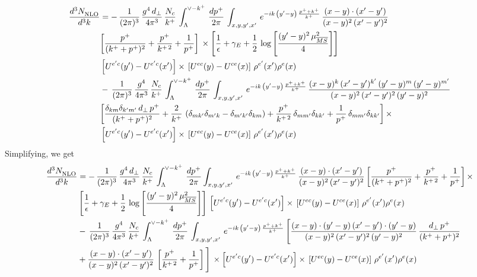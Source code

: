 \documentclass[10pt]{article}
\begin{document}
\begin{align}
     \frac{d^{3}N_{\rm NLO}^{\rm}}{d^{3}k}  & = -\,\frac{1}{(2\pi)^{3}}\,\frac{g^{4}\,d_{\perp}}{4\pi^{3}}\,\frac{N_{c}}{k^{+}}\,\int_{\Lambda}^{\vee-k^{+}}\, \frac{dp^{+}}{2\pi}\,\int_{x,y,y^{\prime},x'}\,e^{-ik\,\left(y'-y\right)\,\frac{p^{+}+k^{+}}{k^{+}}}\,\frac{(x-y)\cdot (x'-y')}{(x-y)^{2}\,(x'-y')^{2}}\notag \\ &  \bigg[\frac{p^{+}}{(k^{+}+p^{+})^{2}} + \frac{p^{+}}{k^{+\,2}}+\frac{1}{p^{+}}\bigg]\,\times\left[\frac{1}{\epsilon} +\gamma_{E} +\frac{1}{2}\,\log{\left[\frac{(y'-y)^{2}\,\mu^{2}_{\overline{MS}}}{4}\right]}\right]\notag \\ &  \left[U^{e'c}(y') - U^{e'c}(x')\right] \times\, \left[U^{ec}(y) - U^{ce}(x)\right]\, \rho^{e'}(x') \rho^{e}(x)\notag \\ & -\,\frac{1}{(2\pi)^{3}}\,\frac{g^{4}}{4\pi^{3}}\,\frac{N_{c}}{k^{+}}\,\int_{\Lambda}^{\vee-k^{+}}\, \frac{dp^{+}}{2\pi}\,\int_{x,y,y^{\prime},x'}\,e^{-ik\,\left(y'-y\right)\,\frac{p^{+}+k^{+}}{k^{+}}}\,\frac{(x-y)^{k}\,(x'-y')^{k'}\,(y'-y)^{m}\,(y'-y)^{m'}}{(x-y)^{2}\,(x'-y')^{2}\,(y'-y)^{2}}\notag \\ &  \bigg[\frac{\delta_{km}\delta_{k'm'}\,d_{\perp}\,p^{+}}{(k^{+}+p^{+})^{2}}+\frac{2}{k^{+}}\,\left(\delta_{mk'}\delta_{m'k}-\delta_{m'k'}\delta_{km}\right) + \frac{p^{+}}{k^{+\,2}}\,\delta_{mm'}\delta_{kk'}+\frac{1}{p^{+}}\,\delta_{mm'}\delta_{kk'}\bigg]\,\times\notag \\ &  \left[U^{e'c}(y') - U^{e'c}(x')\right] \times\, \left[U^{ec}(y) - U^{ce}(x)\right]\, \rho^{e'}(x') \rho^{e}(x)
\end{align}
Simplifying, we get
\begin{align}
     \frac{d^{3}N_{\rm NLO}^{\rm}}{d^{3}k}  & = -\,\frac{1}{(2\pi)^{3}}\,\frac{g^{4}\,d_{\perp}}{4\pi^{3}}\,\frac{N_{c}}{k^{+}}\,\int_{\Lambda}^{\vee-k^{+}}\, \frac{dp^{+}}{2\pi}\int_{x,y,y^{\prime},x'}\,e^{-ik\,\left(y'-y\right)\,\frac{p^{+}+k^{+}}{k^{+}}}\,\frac{(x-y)\cdot (x'-y')}{(x-y)^{2}\,(x'-y')^{2}}\,\bigg[\frac{p^{+}}{(k^{+}+p^{+})^{2}} + \frac{p^{+}}{k^{+\,2}}+\frac{1}{p^{+}}\bigg]\,\times\notag \\ & \left[\frac{1}{\epsilon} +\gamma_{E} +\frac{1}{2}\,\log{\left[\frac{(y'-y)^{2}\,\mu^{2}_{\overline{MS}}}{4}\right]}\right]\,\left[U^{e'c}(y') - U^{e'c}(x')\right] \times\, \left[U^{ec}(y) - U^{ce}(x)\right]\, \rho^{e'}(x') \rho^{e}(x)\notag \\ & -\,\frac{1}{(2\pi)^{3}}\,\frac{g^{4}}{4\pi^{3}}\,\frac{N_{c}}{k^{+}}\,\int_{\Lambda}^{\vee-k^{+}}\, \frac{dp^{+}}{2\pi}\,\int_{x,y,y^{\prime},x'}\,e^{-ik\,\left(y'-y\right)\,\frac{p^{+}+k^{+}}{k^{+}}}\,\Bigg[\frac{(x-y)\cdot (y'-y)\, (x'-y')\cdot (y'-y)}{(x-y)^{2}\,(x'-y')^{2}\,(y'-y)^{2}}\,\frac{d_{\perp}\,p^{+}}{(k^{+}+p^{+})^{2}}\notag \\ & + \frac{(x-y)\cdot (x'-y')}{(x-y)^{2}\,(x'-y')^{2}}\,\left[\frac{p^{+}}{k^{+\,2}} + \frac{1}{p^{+}}\right]\Bigg]\,\times \left[U^{e'c}(y') - U^{e'c}(x')\right] \times\, \left[U^{ec}(y) - U^{ce}(x)\right]\, \rho^{e'}(x') \rho^{e}(x)
\end{align}
\end{document}
